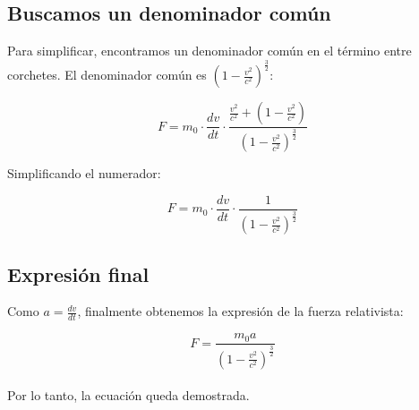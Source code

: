 \documentclass[11pt,letterpaper]{article}
\begin{document}
  \subsection*{Buscamos un denominador común}
  
  Para simplificar, encontramos un denominador común en el término entre corchetes. El denominador común es \( \left(1 - \frac{v^2}{c^2}\right)^{\frac{3}{2}} \):
  
  \[
      F = m_0 \cdot \frac{dv}{dt} \cdot \frac{\frac{v^2}{c^2} + \left(1 - \frac{v^2}{c^2}\right)}{\left(1 - \frac{v^2}{c^2}\right)^{\frac{3}{2}}}
  \]
  
  Simplificando el numerador:
  
  \[
      F = m_0 \cdot \frac{dv}{dt} \cdot \frac{1}{\left(1 - \frac{v^2}{c^2}\right)^{\frac{3}{2}}}
  \]
  
  \subsection*{Expresión final}
  
  Como \( a = \frac{dv}{dt} \), finalmente obtenemos la expresión de la fuerza relativista:
  
  \[
      F = \frac{m_0 a}{\left(1 - \frac{v^2}{c^2}\right)^{\frac{3}{2}}}
  \]
\\Por lo tanto, la ecuación queda demostrada.
\end{document}

